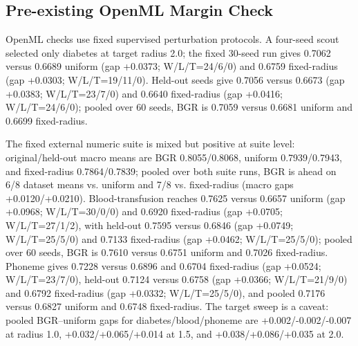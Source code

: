 \documentclass[letterpaper]{article}
\begin{document}
\FloatBarrier

\subsection{Pre-existing OpenML Margin Check}

OpenML checks use fixed supervised perturbation protocols. A four-seed scout selected only diabetes at target radius 2.0; the fixed 30-seed run gives 0.7062 versus 0.6689 uniform (gap +0.0373; W/L/T=24/6/0) and 0.6759 fixed-radius (gap +0.0303; W/L/T=19/11/0). Held-out seeds give 0.7056 versus 0.6673 (gap +0.0383; W/L/T=23/7/0) and 0.6640 fixed-radius (gap +0.0416; W/L/T=24/6/0); pooled over 60 seeds, BGR is 0.7059 versus 0.6681 uniform and 0.6699 fixed-radius.

The fixed external numeric suite is mixed but positive at suite level: original/held-out macro means are BGR 0.8055/0.8068, uniform 0.7939/0.7943, and fixed-radius 0.7864/0.7839; pooled over both suite runs, BGR is ahead on 6/8 dataset means vs. uniform and 7/8 vs. fixed-radius (macro gaps +0.0120/+0.0210). Blood-transfusion reaches 0.7625 versus 0.6657 uniform (gap +0.0968; W/L/T=30/0/0) and 0.6920 fixed-radius (gap +0.0705; W/L/T=27/1/2), with held-out 0.7595 versus 0.6846 (gap +0.0749; W/L/T=25/5/0) and 0.7133 fixed-radius (gap +0.0462; W/L/T=25/5/0); pooled over 60 seeds, BGR is 0.7610 versus 0.6751 uniform and 0.7026 fixed-radius. Phoneme gives 0.7228 versus 0.6896 and 0.6704 fixed-radius (gap +0.0524; W/L/T=23/7/0), held-out 0.7124 versus 0.6758 (gap +0.0366; W/L/T=21/9/0) and 0.6792 fixed-radius (gap +0.0332; W/L/T=25/5/0), and pooled 0.7176 versus 0.6827 uniform and 0.6748 fixed-radius. The target sweep is a caveat: pooled BGR--uniform gaps for diabetes/blood/phoneme are +0.002/-0.002/-0.007 at radius 1.0, +0.032/+0.065/+0.014 at 1.5, and +0.038/+0.086/+0.035 at 2.0.
\end{document}
